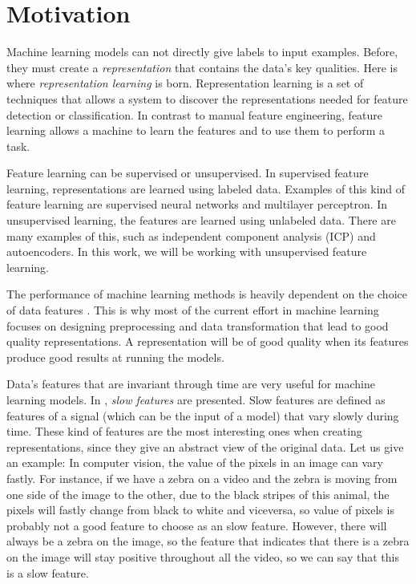 
\section*{Motivation}
Machine learning models can not directly give labels to input examples. Before, they must create a \emph{representation} that 
contains the data's key qualities.  Here is where \emph{representation learning} is born. 
Representation learning is a set of techniques that allows a system to discover the representations needed for feature detection or classification. 
In contrast to manual feature engineering, feature learning allows a machine to learn the features and to use them to perform a task.

Feature learning can be supervised or unsupervised. In supervised feature learning, representations are learned using labeled data.
Examples of this kind of feature learning are supervised neural networks and multilayer perceptron. In unsupervised learning, the features are learned using unlabeled data. 
There are many examples of this, such as independent component analysis (ICP) and autoencoders. In this work, we will be working with unsupervised feature learning.


The performance of machine learning methods is heavily dependent on the choice of data features \cite{bengio_representation_2014}. This is why most of the current 
effort in machine learning focuses on designing preprocessing and data transformation that lead to good quality representations. A representation will be of good quality when its features
produce good results at running the models.

Data's features that are invariant through time are very useful for machine learning models. In \cite{wiskott_slow_2002}, \emph{slow features} are presented. Slow features are defined as features of a signal 
(which can be the input of a model) that vary slowly during time. These kind of features are the most interesting ones when creating representations, since they give an abstract view of the original data.
Let us give an example: In computer vision, the value of the pixels in an image can vary fastly. For instance, if we have a zebra on a video and the zebra is moving from one side of the image to the other, due 
to the black stripes of this animal, the pixels will fastly change from black to white and viceversa, so value of pixels is probably not a good feature to choose as an slow feature. However, there will always
be a zebra on the image, so the feature that indicates that there is a zebra on the image will stay positive throughout all the video, so we can say that this is a slow feature.